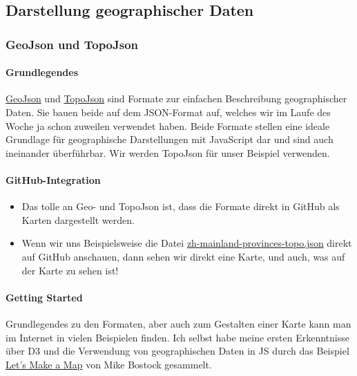 \subsection{\texorpdfstring{{Darstellung geographischer
Daten}}{Darstellung geographischer Daten}}

\subsubsection{\texorpdfstring{{GeoJson und
TopoJson}}{GeoJson und TopoJson}}

\paragraph{Grundlegendes}

\href{http://geojson.org}{GeoJson} und
\href{https://github.com/mbostock/topojson}{TopoJson} sind Formate zur
einfachen Beschreibung geographischer Daten. Sie bauen beide auf dem
JSON-Format auf, welches wir im Laufe des Woche ja schon zuweilen
verwendet haben. Beide Formate stellen eine ideale Grundlage für
geographische Darstellungen mit JavaScript dar und sind auch ineinander
überführbar. Wir werden TopoJson für unser Beispiel verwenden.



\paragraph{GitHub-Integration}

\begin{itemize}
\item
  Das tolle an Geo- und TopoJson ist, dass die Formate direkt in GitHub
  als Karten dargestellt werden.
\item
  Wenn wir uns Beispielsweise die Datei
  \href{https://github.com/LinguList/pyjs-seminar/blob/master/website/demos/china/maps/zh-mainland-provinces.topo.json}{zh-mainland-provinces-topo.json}
  direkt auf GitHub anschauen, dann sehen wir direkt eine Karte, und
  auch, was auf der Karte zu sehen ist!
\end{itemize}


\paragraph{Getting Started}

Grundlegendes zu den Formaten, aber auch zum Gestalten einer Karte kann
man im Internet in vielen Beispielen finden. Ich selbst habe meine
ersten Erkenntnisse über D3 und die Verwendung von geographischen Daten
in JS durch das Beispiel \href{http://bost.ocks.org/mike/map/}{Let's
Make a Map} von Mike Bostock gesammelt.

